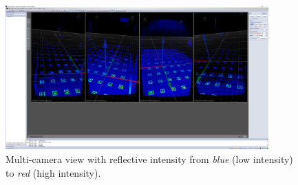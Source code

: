 \begin{figure}
    \centering
    \includegraphics[width=0.9\textwidth]{images/04/qtm_multi_cam_intensity.png}
    \caption{Multi-camera view with reflective intensity from \textit{blue} (low intensity) to \textit{red} (high intensity).}
    \label{fig:qtm_intensity}
\end{figure}


